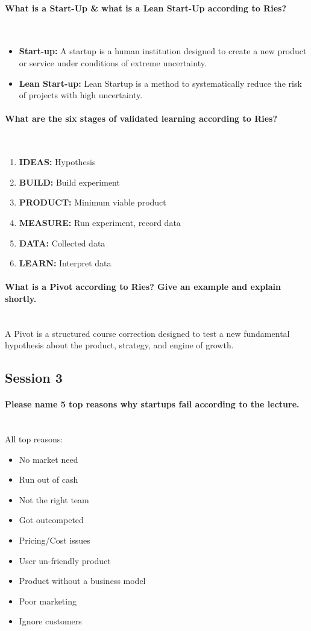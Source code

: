 \documentclass[10pt,a4paper,noendnumber=true]{scrartcl}
\newcommand{\properparagraph}[1]{\paragraph{\textcolor{Emerald}{#1}}\mbox{}\\}
\begin{document}
\properparagraph{What is a Start-Up \& what is a Lean Start-Up according to Ries?}
\begin{itemize}
	\item \textbf{Start-up:} A startup is a human institution designed to create a new product or service under conditions of extreme uncertainty.
	\item \textbf{Lean Start-up:} Lean Startup is a method to systematically reduce the risk of	projects with high uncertainty.
\end{itemize}

\properparagraph{What are the six stages of validated learning according to Ries?}
\begin{enumerate}
	\item \textbf{IDEAS:} Hypothesis
	\item \textbf{BUILD:} Build experiment
	\item \textbf{PRODUCT:} Minimum viable product
	\item \textbf{MEASURE:} Run experiment, record data
	\item \textbf{DATA:} Collected data
	\item \textbf{LEARN:} Interpret data
\end{enumerate}

\properparagraph{What is a Pivot according to Ries? Give an example and explain shortly.}
A Pivot is a structured course correction designed to test a new fundamental hypothesis about the product, strategy, and engine of growth.






\newpage
\subsection{Session 3}
\properparagraph{Please name 5 top reasons why startups fail according to the lecture.}
All top reasons:
\begin{itemize}
	\item No market need
	\item Run out of cash
	\item Not the right team
	\item Got outcompeted
	\item Pricing/Cost issues
	\item User un-friendly product
	\item Product without a business model
	\item Poor marketing
	\item Ignore customers
\end{itemize}
\end{document}
